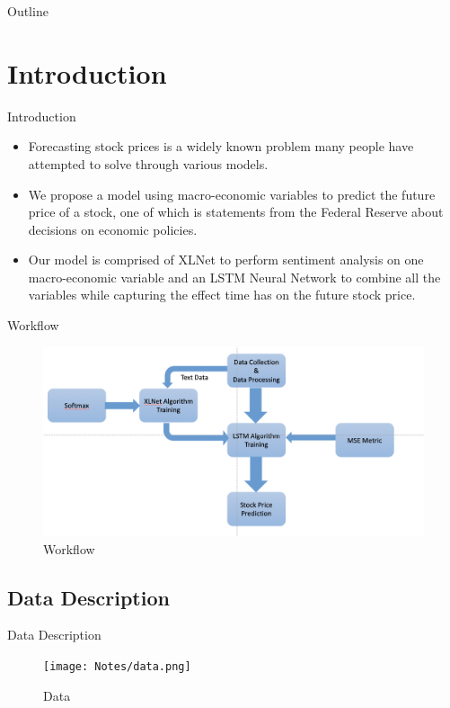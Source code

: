 \documentclass[14pt,aspectratio=169]{beamer}
\author{Blake Hillier, Grace Li, Joe Puhalla}
\title{\TT}
\date{31 March 2020}
\newcommand{\IN}{Introduction}
\newcommand{\WF}{Workflow}
\newcommand{\DAT}{Data Description}
\begin{document}
\begin{frame}
\titlepage
\end{frame}

\begin{frame}{Outline}
    \tableofcontents
\end{frame}

\section{\IN}
\begin{frame}{\IN}
\begin{itemize}
    \item Forecasting stock prices is a widely known problem many people have attempted to solve through various models. \\
    \item We propose a model using macro-economic variables to predict the future price of a stock, one of which is statements from the Federal Reserve about decisions on economic policies.\\
    \item Our model is comprised of XLNet to perform sentiment analysis on one macro-economic variable and an LSTM Neural Network to combine all the variables while capturing the effect time has on the future stock price.
\end{itemize}
\end{frame}

\begin{frame}{\WF}
\begin{figure}
    \centering
    \includegraphics[width=12cm]{workflow.png}
    \caption{Workflow}
    \label{fig:my_label}
\end{figure}
\end{frame}

\subsection{\DAT}
\begin{frame}{\DAT}
\begin{figure}
    \centering
    \texttt{[image: Notes/data.png]}
    \caption{Data}
    \label{fig:my_label}
\end{figure}
\end{frame}
\end{document}
